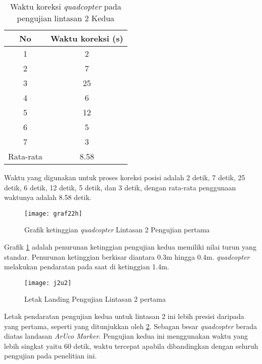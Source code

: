 \begin{table}[H]
	\caption{Waktu koreksi \textit{quadcopter} pada pengujian lintasan 2 Kedua}
	\label{tab:uji22}
	\centering
	\begin{tabular}{@{}|c|c|@{}}
		\hline
		No        & Waktu koreksi (s) \\ \hline
		1         & 2                 \\ \hline
		2         & 7                 \\ \hline
		3         & 25                \\ \hline
		4         & 6                 \\ \hline
		5         & 12                \\ \hline
		6         & 5                 \\ \hline
		7         & 3                 \\ \hline
		Rata-rata & 8.58              \\ \hline
	\end{tabular}
\end{table}

Waktu yang digunakan untuk proses koreksi posisi adalah 2 detik, 7 detik, 25 detik, 6 detik, 12 detik, 5 detik, dan 3 detik, dengan rata-rata penggunaan waktunya adalah 8.58 detik.

\begin{figure}[H]
	\centering
	\texttt{[image: graf22h]}
	\caption{Grafik ketinggian \textit{quadcopter} Lintasan 2 Pengujian pertama}
	\label{fig:graf22h}
\end{figure}

Grafik \cref{fig:graf22h} adalah penurunan ketinggian pengujian kedua memiliki nilai turun yang standar. Penurunan ketinggian berkisar diantara 0.3m hingga 0.4m. \textit{quadcopter} melakukan pendaratan pada saat di ketinggian 1.4m.

\begin{figure}[H]
	\centering
	\texttt{[image: j2u2]}
	\caption{Letak Landing Pengujian Lintasan 2 pertama}
	\label{fig:j2u2}
\end{figure}

Letak pendaratan pengujian kedua untuk lintasan 2 ini lebih presisi daripada yang pertama, seperti yang ditunjukkan oleh \cref{fig:j2u2}. Sebagan besar \textit{quadcopter} berada diatas landasan \textit{ArUco Marker}.
Pengujian kedua ini menggunakan waktu yang lebih singkat yaitu 60 detik, waktu tercepat apabila dibandingkan dengan seluruh pengujian pada penelitian ini.


